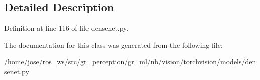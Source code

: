 \subsection{Detailed Description}


Definition at line 116 of file densenet.\+py.



The documentation for this class was generated from the following file\+:\begin{DoxyCompactItemize}
\item 
/home/jose/ros\+\_\+ws/src/gr\+\_\+perception/gr\+\_\+ml/nb/vision/torchvision/models/densenet.\+py\end{DoxyCompactItemize}
